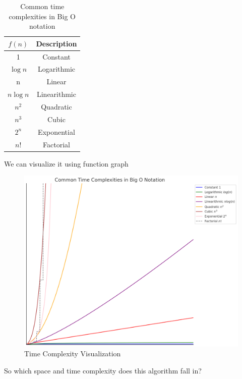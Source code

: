 \documentclass[
	12pt, %
	fleqn, %
	a4paper, %
]{LegrandOrangeBook}
\begin{document}
\begin{table}[ht]
\centering
\begin{tabular}{@{}cc@{}}
\toprule
\( f(n) \) & Description \\ \midrule
1 & Constant \\
\( \log n \) & Logarithmic \\
n & Linear \\
\( n \log n \) & Linearithmic \\
\( n^2 \) & Quadratic \\
\( n^3 \) & Cubic \\
\( 2^n \) & Exponential \\ 
\(n!\) & Factorial \\
\bottomrule
\end{tabular}
\caption{Common time complexities in Big O notation}
\end{table}
We can visualize it using function graph
\begin{figure}[H]
    \centering
    \includegraphics[width=0.8\linewidth]{Images/time complexity.png}
    \caption{Time Complexity Visualization}
    
\end{figure}
So which space and time complexity does this algorithm fall in? 
\end{document}
